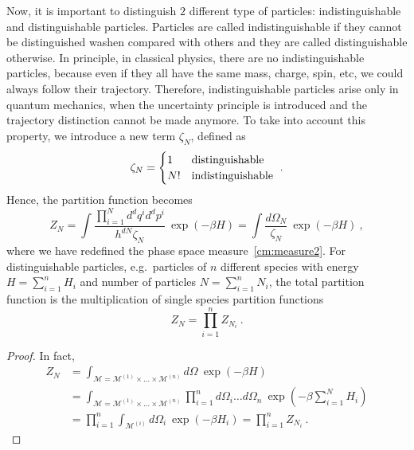     Now, it is important to distinguish $2$ different type of particles: indistinguishable and distinguishable particles. Particles are called indistinguishable if they cannot be distinguished washen compared with others and they are called distinguishable otherwise. In principle, in classical physics, there are no indistinguishable particles, because even if they all have the same mass, charge, spin, etc, we could always follow their trajectory. Therefore, indistinguishable particles arise only in quantum mechanics, when the uncertainty principle is introduced and the trajectory distinction cannot be made anymore. To take into account this property, we introduce a new term $\zeta_N$, defined as 
    \begin{equation}\label{cm:dist}
        \zeta_N = \begin{cases}
            1 & \textnormal{distinguishable} \\
            N! & \textnormal{indistinguishable}
        \end{cases} ~.
    \end{equation}
    Hence, the partition function becomes
    \begin{equation*}
        Z_N = \int \frac{\prod_{i=1}^N d^d q^i d^d p^i}{h^{dN} \zeta_N} ~ \exp (- \beta H) = \int \frac{d\Omega_N}{\zeta_N} ~ \exp (- \beta H) ~,
    \end{equation*}
    where we have redefined the phase space measure~\eqref{cm:measure2}. 
    For distinguishable particles, e.g.~particles of $n$ different species with energy $H = \sum_{i = 1}^{n} H_i$ and number of particles $N = \sum_{i=1}^n N_i$, the total partition function is the multiplication of single species partition functions
    \begin{equation*}
        Z_N = \prod_{i = 1}^{n} Z_{N_i} ~.
    \end{equation*}
    \begin{proof}
        In fact, 
        \begin{equation*}
        \begin{aligned}
            Z_N & = \int_{\mathcal M = \mathcal M^{(1)}\times \ldots \times \mathcal M^{(n)}} d\Omega ~\exp (-\beta H) \\ & = \int_{\mathcal M = \mathcal M^{(1)}\times \ldots \times \mathcal M^{(n)}} \prod_{i = 1}^{n} d\Omega_i \ldots d\Omega_n ~ \exp(-\beta \sum_{i = 1}^{N} H_i) \\ & = \prod_{i = 1}^{n} \int_{\mathcal M^{(i)}} d\Omega_i ~ \exp(- \beta H_i) = \prod_{i = 1}^{n} Z_{N_i} ~.
        \end{aligned}
        \end{equation*}
    \end{proof}
